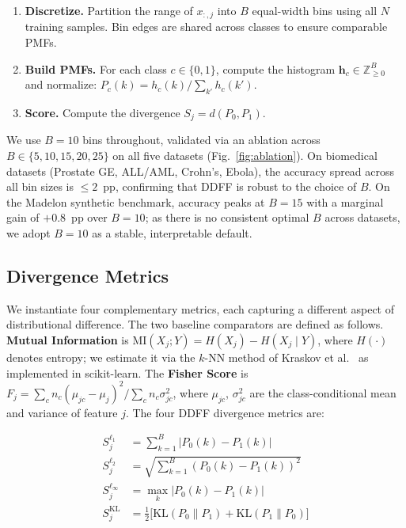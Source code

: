 \documentclass[conference]{IEEEtran}
\begin{document}
\begin{enumerate}
    \item \textbf{Discretize.} Partition the range of $x_{:,j}$ into $B$ equal-width bins using all $N$ training samples. Bin edges are shared across classes to ensure comparable PMFs.
    \item \textbf{Build PMFs.} For each class $c \in \{0,1\}$, compute the histogram $\mathbf{h}_c \in \mathbb{Z}_{\geq 0}^B$ and normalize: $P_c(k) = h_c(k) / \sum_{k'} h_c(k')$.
    \item \textbf{Score.} Compute the divergence $S_j = d(P_0, P_1)$.
\end{enumerate}

\noindent We use $B=10$ bins throughout, validated via an ablation across $B \in \{5, 10, 15, 20, 25\}$ on all five datasets (Fig.~\ref{fig:ablation}). On biomedical datasets (Prostate GE, ALL/AML, Crohn's, Ebola), the accuracy spread across all bin sizes is $\leq 2$~pp, confirming that DDFF is robust to the choice of $B$. On the Madelon synthetic benchmark, accuracy peaks at $B=15$ with a marginal gain of $+0.8$~pp over $B=10$; as there is no consistent optimal $B$ across datasets, we adopt $B=10$ as a stable, interpretable default.

\subsection{Divergence Metrics}

We instantiate four complementary metrics, each capturing a different aspect of distributional difference. The two baseline comparators are defined as follows. \textbf{Mutual Information} is $\text{MI}(X_j; Y) = H(X_j) - H(X_j \mid Y)$, where $H(\cdot)$ denotes entropy; we estimate it via the $k$-NN method of Kraskov et al.\ \cite{Kraskov2004MutualInfoNN} as implemented in scikit-learn. The \textbf{Fisher Score} is $F_j = \sum_c n_c(\mu_{jc} - \mu_j)^2 \big/ \sum_c n_c \sigma_{jc}^2$, where $\mu_{jc}$, $\sigma_{jc}^2$ are the class-conditional mean and variance of feature $j$. The four DDFF divergence metrics are:

\begin{align}
    S_j^{\ell_1} &= \sum_{k=1}^{B} |P_0(k) - P_1(k)| \label{eq:l1} \\
    S_j^{\ell_2} &= \sqrt{\sum_{k=1}^{B} (P_0(k) - P_1(k))^2} \label{eq:l2} \\
    S_j^{\ell_\infty} &= \max_{k} |P_0(k) - P_1(k)| \label{eq:max} \\
    S_j^{\text{KL}} &= \tfrac{1}{2}\bigl[\text{KL}(P_0 \| P_1) + \text{KL}(P_1 \| P_0)\bigr] \label{eq:kl}
\end{align}
\end{document}
